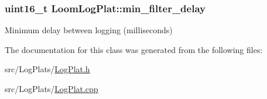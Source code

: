 \subsubsection[{\texorpdfstring{min\+\_\+filter\+\_\+delay}{min_filter_delay}}]{\setlength{\rightskip}{0pt plus 5cm}uint16\+\_\+t Loom\+Log\+Plat\+::min\+\_\+filter\+\_\+delay\hspace{0.3cm}{\ttfamily [protected]}}\hypertarget{class_loom_log_plat_a3d4ffe4204560b9677b8007be7f522be}{}\label{class_loom_log_plat_a3d4ffe4204560b9677b8007be7f522be}


Minimum delay between logging (milliseconds) 



The documentation for this class was generated from the following files\+:\begin{DoxyCompactItemize}
\item 
src/\+Log\+Plats/\hyperlink{_log_plat_8h}{Log\+Plat.\+h}\item 
src/\+Log\+Plats/\hyperlink{_log_plat_8cpp}{Log\+Plat.\+cpp}\end{DoxyCompactItemize}
